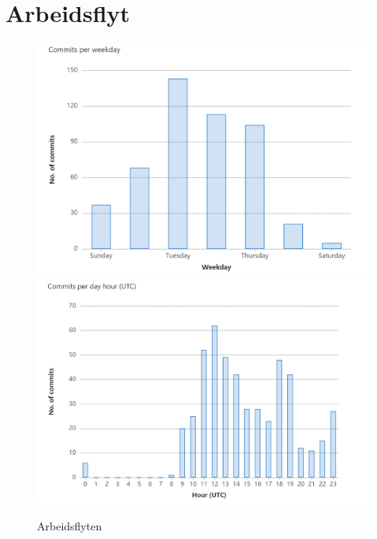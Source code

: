 \addappendix
\section{Arbeidsflyt}
\label{sec:Arbeidsflyt}
\begin{figure}[H]
\begin{center}
    \includegraphics[width=1\columnwidth]{bilder/commitsperweekday.png}
    \includegraphics[width=1\columnwidth]{bilder/commitsperhour.png}
    \caption{Arbeidsflyten\label{Fig:commitsperhour}}
\end{center}
\end{figure}


